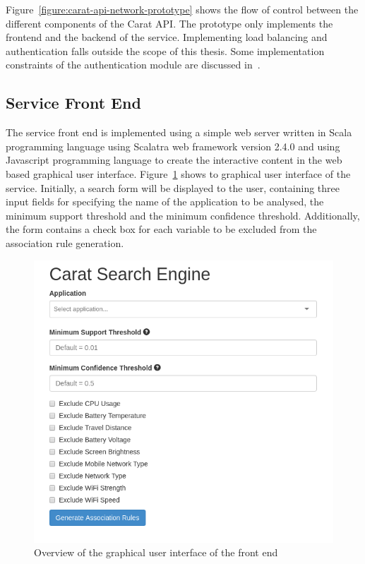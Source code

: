 Figure~\ref{figure:carat-api-network-prototype} shows the flow of control between the different components of the Carat API. The prototype only implements the frontend and the backend of the service. Implementing load balancing and authentication falls outside the scope of this thesis. Some implementation constraints of the authentication module are discussed in~\cite{7840871}.     

\subsection{Service Front End} 

The service front end is implemented using a simple web server written in Scala programming language using Scalatra web framework version 2.4.0 and using Javascript programming language to create the interactive content in the web based graphical user interface. Figure~\ref{figure:frontend-overview} shows to graphical user interface of the service. Initially, a search form will be displayed to the user, containing three input fields for specifying the name of the application to be analysed, the minimum support threshold and the minimum confidence threshold. Additionally, the form contains a check box for each variable to be excluded from the association rule generation. 

\begin{figure}[!htbp]
	\centering
	\includegraphics[width=\textwidth]{images/frontend/frontend_overview.png}
	\caption{Overview of the graphical user interface of the front end}
	\label{figure:frontend-overview}
\end{figure} 

